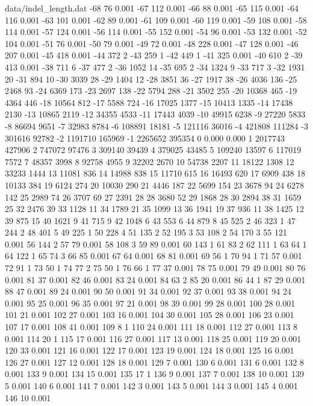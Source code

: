 \begin{filecontents}{data/indel_length.dat}
-68	76	0.001
-67	112	0.001
-66	88	0.001
-65	115	0.001
-64	116	0.001
-63	101	0.001
-62	89	0.001
-61	109	0.001
-60	119	0.001
-59	108	0.001
-58	114	0.001
-57	124	0.001
-56	114	0.001
-55	152	0.001
-54	96	0.001
-53	132	0.001
-52	104	0.001
-51	76	0.001
-50	79	0.001
-49	72	0.001
-48	228	0.001
-47	128	0.001
-46	207	0.001
-45	418	0.001
-44	372	2
-43	259	1
-42	449	1
-41	325	0.001
-40	610	2
-39	413	0.001
-38	711	6
-37	477	2
-36	1052	14
-35	695	2
-34	1324	9
-33	717	3
-32	1931	20
-31	894	10
-30	3039	28
-29	1404	12
-28	3851	36
-27	1917	38
-26	4036	136
-25	2468	93
-24	6369	173
-23	2697	138
-22	5794	288
-21	3502	255
-20	10368	465
-19	4364	446
-18	10564	812
-17	5588	724
-16	17025	1377
-15	10413	1335
-14	17438	2130
-13	10865	2119
-12	34355	4533
-11	17443	4039
-10	49915	6238
-9	27220	5833
-8	86694	9651
-7	32983	8784
-6	108891	18181
-5	121116	36016
-4	421808	111284
-3	301616	92782
-2	1191710	165969
-1	2265652	395354
0	0.000	0.000
1	2017743	427906
2	747072	97476
3	309140	39439
4	379025	43485
5	109240	13597
6	117019	7572
7	48357	3998
8	92758	4955
9	32202	2670
10	54738	2207
11	18122	1308
12	33233	1444
13	11081	836
14	14988	838
15	11710	615
16	16493	620
17	6909	438
18	10133	384
19	6124	274
20	10030	290
21	4446	187
22	5699	154
23	3678	94
24	6278	142
25	2989	74
26	3707	69
27	2391	28
28	3680	52
29	1868	28
30	2894	38
31	1659	25
32	2476	39
33	1128	11
34	1789	21
35	1099	13
36	1941	19
37	936	11
38	1425	12
39	875	15
40	1621	9
41	715	9
42	1048	6
43	553	6
44	879	8
45	525	2
46	323	1
47	244	2
48	401	5
49	225	1
50	228	4
51	135	2
52	195	3
53	108	2
54	170	3
55	121	0.001
56	144	2
57	79	0.001
58	108	3
59	89	0.001
60	143	1
61	83	2
62	111	1
63	64	1
64	122	1
65	74	3
66	85	0.001
67	64	0.001
68	81	0.001
69	56	1
70	94	1
71	57	0.001
72	91	1
73	50	1
74	77	2
75	50	1
76	66	1
77	37	0.001
78	75	0.001
79	49	0.001
80	76	0.001
81	37	0.001
82	46	0.001
83	24	0.001
84	63	2
85	20	0.001
86	44	1
87	29	0.001
88	47	0.001
89	24	0.001
90	50	0.001
91	34	0.001
92	37	0.001
93	38	0.001
94	24	0.001
95	25	0.001
96	35	0.001
97	21	0.001
98	39	0.001
99	28	0.001
100	28	0.001
101	21	0.001
102	27	0.001
103	16	0.001
104	30	0.001
105	28	0.001
106	23	0.001
107	17	0.001
108	41	0.001
109	8	1
110	24	0.001
111	18	0.001
112	27	0.001
113	8	0.001
114	20	1
115	17	0.001
116	27	0.001
117	13	0.001
118	25	0.001
119	20	0.001
120	33	0.001
121	16	0.001
122	17	0.001
123	19	0.001
124	18	0.001
125	16	0.001
126	27	0.001
127	12	0.001
128	18	0.001
129	7	0.001
130	6	0.001
131	6	0.001
132	8	0.001
133	9	0.001
134	15	0.001
135	17	1
136	9	0.001
137	7	0.001
138	10	0.001
139	5	0.001
140	6	0.001
141	7	0.001
142	3	0.001
143	5	0.001
144	3	0.001
145	4	0.001
146	10	0.001

\end{filecontents}
